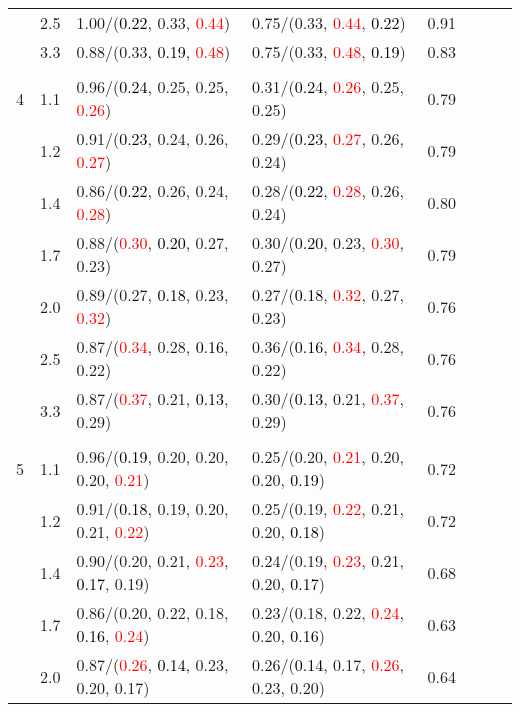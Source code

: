 \documentclass[10pt,a4paper]{report}
\begin{document}
\begin{table}[!htbp]
\begin{center}
{\begin{tabular}{ccllcccc}
			&2.5&1.00/(\textcolor{black}{0.22}, 0.33, \textcolor{red}{0.44})&0.75/(0.33, \textcolor{red}{0.44}, \textcolor{black}{0.22})&0.91\\
			&3.3&0.88/(0.33, \textcolor{black}{0.19}, \textcolor{red}{0.48})&0.75/(0.33, \textcolor{red}{0.48}, \textcolor{black}{0.19})&0.83\\
			&&&&\\
			4			&1.1&0.96/(\textcolor{black}{0.24}, 0.25, 0.25, \textcolor{red}{0.26})&0.31/(\textcolor{black}{0.24}, \textcolor{red}{0.26}, 0.25, 0.25)&0.79\\
			&1.2&0.91/(\textcolor{black}{0.23}, 0.24, 0.26, \textcolor{red}{0.27})&0.29/(\textcolor{black}{0.23}, \textcolor{red}{0.27}, 0.26, 0.24)&0.79\\
			&1.4&0.86/(\textcolor{black}{0.22}, 0.26, 0.24, \textcolor{red}{0.28})&0.28/(\textcolor{black}{0.22}, \textcolor{red}{0.28}, 0.26, 0.24)&0.80\\
			&1.7&0.88/(\textcolor{red}{0.30}, \textcolor{black}{0.20}, 0.27, 0.23)&0.30/(\textcolor{black}{0.20}, 0.23, \textcolor{red}{0.30}, 0.27)&0.79\\
			&2.0&0.89/(0.27, \textcolor{black}{0.18}, 0.23, \textcolor{red}{0.32})&0.27/(\textcolor{black}{0.18}, \textcolor{red}{0.32}, 0.27, 0.23)&0.76\\
			&2.5&0.87/(\textcolor{red}{0.34}, 0.28, \textcolor{black}{0.16}, 0.22)&0.36/(\textcolor{black}{0.16}, \textcolor{red}{0.34}, 0.28, 0.22)&0.76\\
			&3.3&0.87/(\textcolor{red}{0.37}, 0.21, \textcolor{black}{0.13}, 0.29)&0.30/(\textcolor{black}{0.13}, 0.21, \textcolor{red}{0.37}, 0.29)&0.76\\
			&&&&\\
			5			&1.1&0.96/(\textcolor{black}{0.19}, 0.20, 0.20, 0.20, \textcolor{red}{0.21})&0.25/(0.20, \textcolor{red}{0.21}, 0.20, 0.20, \textcolor{black}{0.19})&0.72\\
			&1.2&0.91/(\textcolor{black}{0.18}, 0.19, 0.20, 0.21, \textcolor{red}{0.22})&0.25/(0.19, \textcolor{red}{0.22}, 0.21, 0.20, \textcolor{black}{0.18})&0.72\\
			&1.4&0.90/(0.20, 0.21, \textcolor{red}{0.23}, \textcolor{black}{0.17}, 0.19)&0.24/(0.19, \textcolor{red}{0.23}, 0.21, 0.20, \textcolor{black}{0.17})&0.68\\
			&1.7&0.86/(0.20, 0.22, 0.18, \textcolor{black}{0.16}, \textcolor{red}{0.24})&0.23/(0.18, 0.22, \textcolor{red}{0.24}, 0.20, \textcolor{black}{0.16})&0.63\\
			&2.0&0.87/(\textcolor{red}{0.26}, \textcolor{black}{0.14}, 0.23, 0.20, 0.17)&0.26/(\textcolor{black}{0.14}, 0.17, \textcolor{red}{0.26}, 0.23, 0.20)&0.64\\

\end{tabular}}
\end{center}
\end{table}
\end{document}
